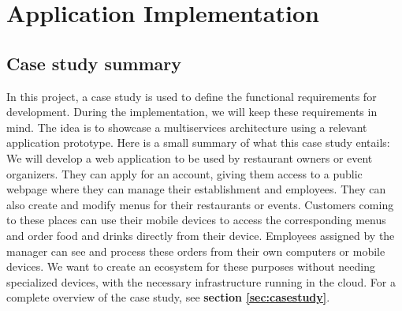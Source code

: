 \documentclass[12pt]{article}
\begin{document}
\section{Application Implementation}\label{sec:implementation}

\begin{multicols}{2}
\subsection{Case study summary}
In this project, a case study is used to define the functional requirements for development. During the implementation, we will keep these requirements in mind. The idea is to showcase a multiservices architecture using a relevant application prototype. Here is a small summary of what this case study entails: We will develop a web application to be used by restaurant owners or event organizers. They can apply for an account, giving them access to a public webpage where they can manage their establishment and employees. They can also create and modify menus for their restaurants or events. Customers coming to these places can use their mobile devices to access the corresponding menus and order food and drinks directly from their device. Employees assigned by the manager can see and process these orders from their own computers or mobile devices. We want to create an ecosystem for these purposes without needing specialized devices, with the necessary infrastructure running in the cloud. For a complete overview of the case study, see \textbf{section \ref{sec:casestudy}}.


\end{multicols}
\end{document}
